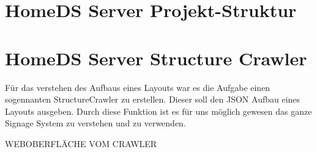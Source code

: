 \section{HomeDS Server Projekt-Struktur}\label{sec:javaeestruktur}


\section{HomeDS Server Structure Crawler}\label{sec:javaeestructurecrawler}
Für das verstehen des Aufbaus eines Layouts war es die Aufgabe einen sogennanten StructureCrawler zu erstellen. Dieser soll den JSON Aufbau eines Layouts ausgeben. Durch diese Funktion ist es für uns möglich gewesen das ganze Signage System zu verstehen und zu verwenden. 

WEBOBERFLÄCHE VOM CRAWLER
